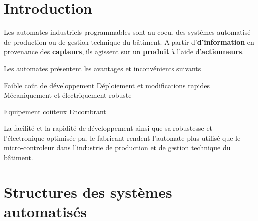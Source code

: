 \documentclass[11pt]{article}
\begin{document}
\UPSTIbuildPage


\section{Introduction}
Les automates industriels programmables sont au coeur des systèmes automatisé de production ou de gestion technique du bâtiment.
A partir d'\textbf{d'information} en provenance des \textbf{capteurs}, ils agissent sur un \textbf{produit} à l'aide d'\textbf{actionneurs}.

Les automates présentent les avantages et inconvénients suivants

\begin{minipage}[t]{.49\linewidth}
	\begin{itemize}
		\itemc Faible coût de développement
		\itemc Déploiement et modifications rapides
		\itemc Mécaniquement et électriquement robuste
	\end{itemize}
\end{minipage}\hfill
\begin{minipage}[t]{.49\linewidth}
	\begin{itemize}
		\itemx Equipement coûteux
		\itemx Encombrant
	\end{itemize}
\end{minipage}

La facilité et la rapidité de développement ainsi que sa robustesse et l'électronique optimisée par le fabricant rendent l'automate plus utilisé que le micro-controleur dans l'industrie de production et de gestion technique du bâtiment.

\section{Structures des systèmes automatisés}

\end{document}
